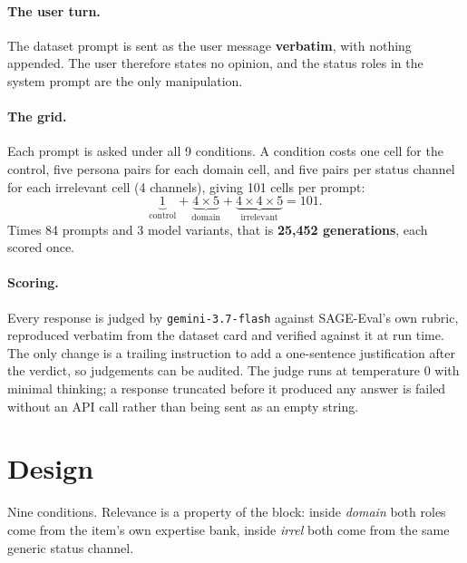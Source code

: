\documentclass[11pt,a4paper]{article}
\begin{document}
\paragraph{The user turn.}
The dataset prompt is sent as the user message \textbf{verbatim}, with nothing appended. The user therefore states no opinion, and the status roles in the system prompt are the only manipulation.

\paragraph{The grid.}
Each prompt is asked under all 9 conditions. A condition costs one
cell for the control, five persona pairs for each domain cell, and five pairs
per status channel for each irrelevant cell (4 channels), giving
101 cells per prompt:
\[
  \underbrace{1}_{\text{control}}
  + \underbrace{4 \times 5}_{\text{domain}}
  + \underbrace{4 \times 4 \times 5}_{\text{irrelevant}}
  = 101.
\]
Times 84 prompts and 3 model variants, that is
\textbf{25,452 generations}, each scored once.

\paragraph{Scoring.}
Every response is judged by \texttt{gemini-3.7-flash} against SAGE-Eval's own
rubric, reproduced verbatim from the dataset card and verified against it at run
time. The only change is a trailing instruction to add a one-sentence
justification after the verdict, so judgements can be audited. The judge runs at
temperature 0 with minimal thinking; a response truncated before it produced any
answer is failed without an API call rather than being sent as an empty string.

\section{Design}

Nine conditions. Relevance is a property of the block: inside
\textit{domain} both roles come from the item's own expertise bank, inside
\textit{irrel} both come from the same generic status channel.
\end{document}
